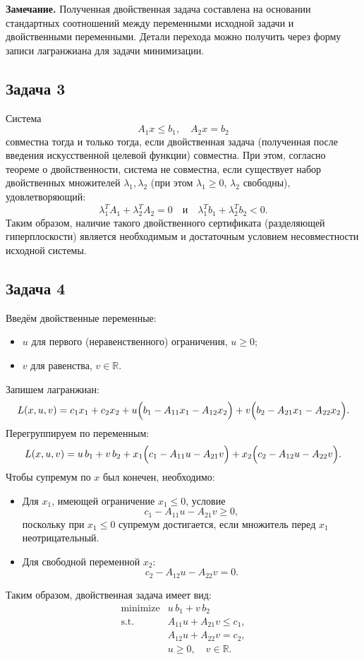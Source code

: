 \documentclass[a4paper,12pt]{article}
\begin{document}
	\textbf{Замечание.} Полученная двойственная задача составлена на основании стандартных соотношений между переменными исходной задачи и двойственными переменными. Детали перехода можно получить через форму записи лагранжиана для задачи минимизации.
	
	\bigskip
	
	\subsection*{Задача 3}
	
	\medskip
	
	\textbf{} Система
	\[
	A_1x\le b_1,\quad A_2x = b_2
	\]
	совместна тогда и только тогда, если двойственная задача (полученная после введения искусственной целевой функции) совместна. При этом, согласно теореме о двойственности, система не совместна, если существует набор двойственных множителей $\lambda_1,\lambda_2$ (при этом $\lambda_1\ge 0$, $\lambda_2$ свободны), удовлетворяющий:
	\[
	\lambda_1^T A_1 + \lambda_2^T A_2 = 0 \quad \text{и} \quad \lambda_1^T b_1 + \lambda_2^T b_2 < 0.
	\]
	Таким образом, наличие такого двойственного сертификата (разделяющей гиперплоскости) является необходимым и достаточным условием несовместности исходной системы.
	
	\bigskip
	
	\subsection*{Задача 4 }
	
	Введём двойственные переменные:
	\begin{itemize}[leftmargin=1cm]
		\item $u$ для первого (неравенственного) ограничения, $u\ge0$;
		\item $v$ для равенства, $v\in\mathbb{R}$.
	\end{itemize}
	
	Запишем лагранжиан:
	\[
	L(x,u,v)=c_1x_1+c_2x_2 + u\Bigl(b_1-A_{11}x_1-A_{12}x_2\Bigr) + v\Bigl(b_2-A_{21}x_1-A_{22}x_2\Bigr).
	\]
	Перегруппируем по переменным:
	\[
	L(x,u,v)=u\,b_1+v\,b_2 + x_1\Bigl(c_1-A_{11}u-A_{21}v\Bigr)+ x_2\Bigl(c_2-A_{12}u-A_{22}v\Bigr).
	\]
	Чтобы супремум по $x$ был конечен, необходимо:
	\begin{itemize}[leftmargin=1cm]
		\item Для $x_1$, имеющей ограничение $x_1\le 0$, условие
		\[
		c_1-A_{11}u-A_{21}v \ge 0,
		\]
		поскольку при $x_1\le 0$ супремум достигается, если множитель перед $x_1$ неотрицательный.
		\item Для свободной переменной $x_2$:
		\[
		c_2-A_{12}u-A_{22}v=0.
		\]
	\end{itemize}
	Таким образом, двойственная задача имеет вид:
	\[
	\begin{array}{rl}
		\text{minimize} & u\,b_1+v\,b_2\\[1mm]
		\text{s.t.} & A_{11}u+A_{21}v \le c_1,\\[1mm]
		& A_{12}u+A_{22}v = c_2,\\[1mm]
		& u\ge 0,\quad v\in\mathbb{R}.
	\end{array}
	\]
	
\end{document}
